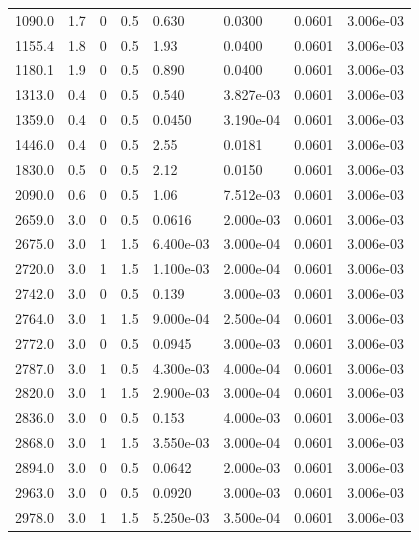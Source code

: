 \documentclass[preview]{standalone}
\begin{document}
{{\begin{tabular}{L{1.2cm}C{1.2cm} C{0.3cm}C{0.5cm} C{1.4cm}C{1.4cm} C{1.4cm}C{1.4cm}}
  1090.0  &   1.7  & 0     & 0.5 &  0.630  & 0.0300  & 0.0601 &  3.006e-03   \\ 
  1155.4  &   1.8  & 0     & 0.5 &  1.93  & 0.0400  & 0.0601 &  3.006e-03   \\ 
  1180.1  &   1.9  & 0     & 0.5 &  0.890  & 0.0400  & 0.0601 &  3.006e-03   \\ 
  1313.0  &   0.4  & 0     & 0.5 &  0.540  & 3.827e-03  & 0.0601 &  3.006e-03   \\ 
  1359.0  &   0.4  & 0     & 0.5 &  0.0450  & 3.190e-04  & 0.0601 &  3.006e-03   \\ 
  1446.0  &   0.4  & 0     & 0.5 &  2.55  & 0.0181  & 0.0601 &  3.006e-03   \\ 
  1830.0  &   0.5  & 0     & 0.5 &  2.12  & 0.0150  & 0.0601 &  3.006e-03   \\ 
  2090.0  &   0.6  & 0     & 0.5 &  1.06  & 7.512e-03  & 0.0601 &  3.006e-03   \\ 
  2659.0  &   3.0  & 0     & 0.5 &  0.0616  & 2.000e-03  & 0.0601 &  3.006e-03   \\ 
  2675.0  &   3.0  & 1     & 1.5 &  6.400e-03  & 3.000e-04  & 0.0601 &  3.006e-03   \\ 
  2720.0  &   3.0  & 1     & 1.5 &  1.100e-03  & 2.000e-04  & 0.0601 &  3.006e-03   \\ 
  2742.0  &   3.0  & 0     & 0.5 &  0.139  & 3.000e-03  & 0.0601 &  3.006e-03   \\ 
  2764.0  &   3.0  & 1     & 1.5 &  9.000e-04  & 2.500e-04  & 0.0601 &  3.006e-03   \\ 
  2772.0  &   3.0  & 0     & 0.5 &  0.0945  & 3.000e-03  & 0.0601 &  3.006e-03   \\ 
  2787.0  &   3.0  & 1     & 0.5 &  4.300e-03  & 4.000e-04  & 0.0601 &  3.006e-03   \\ 
  2820.0  &   3.0  & 1     & 1.5 &  2.900e-03  & 3.000e-04  & 0.0601 &  3.006e-03   \\ 
  2836.0  &   3.0  & 0     & 0.5 &  0.153  & 4.000e-03  & 0.0601 &  3.006e-03   \\ 
  2868.0  &   3.0  & 1     & 1.5 &  3.550e-03  & 3.000e-04  & 0.0601 &  3.006e-03   \\ 
  2894.0  &   3.0  & 0     & 0.5 &  0.0642  & 2.000e-03  & 0.0601 &  3.006e-03   \\ 
  2963.0  &   3.0  & 0     & 0.5 &  0.0920  & 3.000e-03  & 0.0601 &  3.006e-03   \\ 
  2978.0  &   3.0  & 1     & 1.5 &  5.250e-03  & 3.500e-04  & 0.0601 &  3.006e-03   \\ 

\end{tabular}}}
\end{document}

